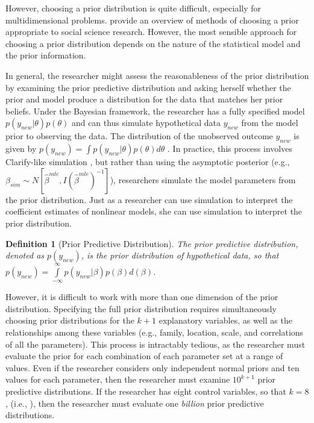 \documentclass[12pt]{article}
\newtheorem{defn}{Definition}
\begin{document}
However, choosing a prior distribution is quite difficult, especially for multidimensional problems. \cite{GillWalker2005} provide an overview of methods of choosing a prior appropriate to social science research. However, the most sensible approach for choosing a prior distribution depends on the nature of the statistical model and the prior information.

In general, the researcher might assess the reasonableness of the prior distribution by examining the prior predictive distribution and asking herself whether the prior and model produce a distribution for the data that matches her prior beliefs. Under the Bayesian framework, the researcher has a fully specified model $p(y_{new}|\theta)p(\theta)$ and can thus simulate hypothetical data $y_{new}$ from the model prior to observing the data. The distribution of the unobserved outcome $y_{new}$ is given by $p(y_{new}) = \int p(y_{new} | \theta)p(\theta) d\theta$ \citep{Box1980}. In practice, this process involves Clarify-like simulation \citep{KingTomzWittenberg2000}, but rather than using the asymptotic posterior (e.g., $\beta_{sim} \sim N\left[\hat{\beta}^{mle}, I(\hat{\beta}^{mle})^{-1}\right]$), researchers simulate the model parameters from the prior distribution. Just as a researcher can use simulation to interpret the coefficient estimates of nonlinear models, she can use simulation to interpret the prior distribution.

\begin{defn}[Prior Predictive Distribution] The prior predictive distribution, denoted as $p(y_{new})$, is the prior distribution of hypothetical data, so that $p(y_{new}) = \int\limits_{-\infty}^{\infty} p(y_{new} | \beta)p(\beta)d(\beta)$.
\end{defn}

However, it is difficult to work with more than one dimension of the prior distribution. Specifying the full prior distribution requires simultaneously choosing prior distributions for the $k + 1$ explanatory variables, as well as the relationships among these variables (e.g., family, location, scale, and correlations of all the parameters). This process is intractably tedious, as the researcher must evaluate the prior for each combination of each parameter set at a range of values. Even if the researcher considers only independent normal priors and ten values for each parameter, then the researcher must examine $10^{k+1}$ prior predictive distributions. If the researcher has eight control variables, so that $k = 8$, (i.e., \citealt{BarrilleauxRainey2014}), then the researcher must evaluate one \emph{billion} prior predictive distributions.
\end{document}
